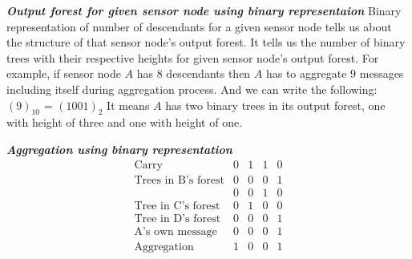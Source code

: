 	\textit{\textbf{Output forest for given sensor node using binary representaion}}
	Binary representation of number of descendants for a given sensor node tells us about the structure of that sensor node's output forest. 
	It tells us the number of binary trees with their respective heights for given sensor node's output forest.
	For example, if sensor node $A$ has $8$ descendants then $A$ has to aggregate $9$ messages including itself during aggregation process.
	And we can write the following:	$(9)_{10}$ = $(1001)_{2}$ 
	It means $A$ has two binary trees in its output forest, one with height of three and one with height of one.

	\textit{\textbf{ Aggregation using binary representation}}
	\[ 
		\begin{array}{lcccc}
			\mbox{Carry} & 0 & 1 & 1 & 0\\
			\hline
			\mbox{Trees in B's forest} & 0 & 0 & 0 & 1 \\
			\mbox{ } & 0 & 0 & 1 & 0 \\
			\hline
			\mbox{Tree in C's forest} & 0 & 1 & 0 & 0 \\
			\hline
			\mbox{Tree in D's forest} & 0 & 0 & 0 & 1 \\
			\hline
			\mbox{A's own message} & 0 & 0 & 0 & 1 \\
			\hline
			\mbox{Aggregation} & 1 & 0 & 0 & 1 
		\end{array}
	\] 

